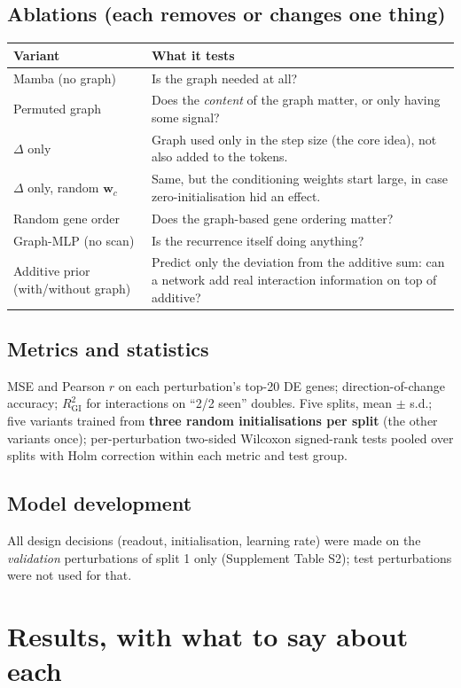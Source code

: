 \documentclass[10.5pt]{article}
\begin{document}
\subsection*{Ablations (each removes or changes one thing)}
\begin{tabular}{@{}p{4.4cm}p{11.1cm}@{}}
\toprule
Variant & What it tests\\
\midrule
Mamba (no graph) & Is the graph needed at all?\\
Permuted graph & Does the \emph{content} of the graph matter, or only having some signal?\\
$\Delta$ only & Graph used only in the step size (the core idea), not also added to the tokens.\\
$\Delta$ only, random $\mathbf{w}_c$ & Same, but the conditioning weights start large, in case zero-initialisation hid an effect.\\
Random gene order & Does the graph-based gene ordering matter?\\
Graph-MLP (no scan) & Is the recurrence itself doing anything?\\
Additive prior (with/without graph) & Predict only the deviation from the additive sum: can a network add real
interaction information on top of additive?\\
\bottomrule
\end{tabular}

\subsection*{Metrics and statistics}
MSE and Pearson $r$ on each perturbation's top-20 DE genes; direction-of-change accuracy; $R^2_{\mathrm{GI}}$
for interactions on ``2/2 seen'' doubles. Five splits, mean $\pm$ s.d.; five variants trained from
\textbf{three random initialisations per split} (the other variants once); per-perturbation two-sided Wilcoxon
signed-rank tests pooled over splits with Holm correction within each metric and test group.

\subsection*{Model development}
All design decisions (readout, initialisation, learning rate) were made on the \emph{validation} perturbations
of split 1 only (Supplement Table S2); test perturbations were not used for that.

\section{Results, with what to say about each}
\end{document}
